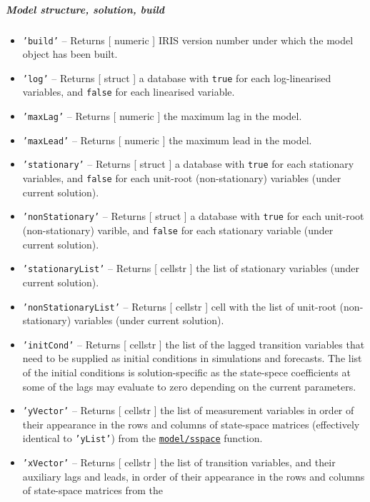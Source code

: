 \subparagraph{Model structure, solution,
build}\label{model-structure-solution-build}

\begin{itemize}
\item
  \texttt{'build'} -- Returns {[} numeric {]} IRIS version number under
  which the model object has been built.
\item
  \texttt{'log'} -- Returns {[} struct {]} a database with \texttt{true}
  for each log-linearised variables, and \texttt{false} for each
  linearised variable.
\item
  \texttt{'maxLag'} -- Returns {[} numeric {]} the maximum lag in the
  model.
\item
  \texttt{'maxLead'} -- Returns {[} numeric {]} the maximum lead in the
  model.
\item
  \texttt{'stationary'} -- Returns {[} struct {]} a database with
  \texttt{true} for each stationary variables, and \texttt{false} for
  each unit-root (non-stationary) variables (under current solution).
\item
  \texttt{'nonStationary'} -- Returns {[} struct {]} a database with
  \texttt{true} for each unit-root (non-stationary) varible, and
  \texttt{false} for each stationary variable (under current solution).
\item
  \texttt{'stationaryList'} -- Returns {[} cellstr {]} the list of
  stationary variables (under current solution).
\item
  \texttt{'nonStationaryList'} -- Returns {[} cellstr {]} cell with the
  list of unit-root (non-stationary) variables (under current solution).
\item
  \texttt{'initCond'} -- Returns {[} cellstr {]} the list of the lagged
  transition variables that need to be supplied as initial conditions in
  simulations and forecasts. The list of the initial conditions is
  solution-specific as the state-spece coefficients at some of the lags
  may evaluate to zero depending on the current parameters.
\item
  \texttt{'yVector'} -- Returns {[} cellstr {]} the list of measurement
  variables in order of their appearance in the rows and columns of
  state-space matrices (effectively identical to \texttt{'yList'}) from
  the \href{model/sspace}{\texttt{model/sspace}} function.
\item
  \texttt{'xVector'} -- Returns {[} cellstr {]} the list of transition
  variables, and their auxiliary lags and leads, in order of their
  appearance in the rows and columns of state-space matrices from the

\end{itemize}
